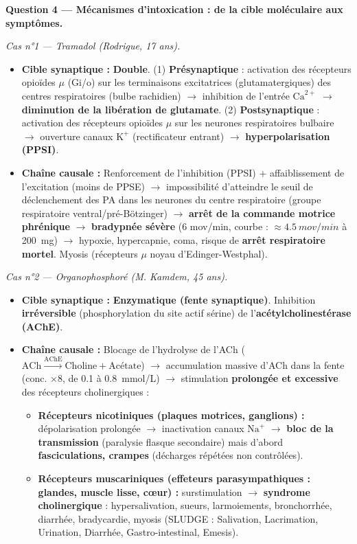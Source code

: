 \documentclass[11pt]{article}
\begin{document}
\begin{exoresolu}
\medskip

\textbf{Question 4 — Mécanismes d'intoxication : de la cible moléculaire aux symptômes.}

\emph{Cas n°1 — Tramadol (Rodrigue, 17 ans).}
\begin{itemize}
\item \textbf{Cible synaptique :} \textbf{Double}. (1) \textbf{Présynaptique} : activation des récepteurs opioïdes $\mu$ (Gi/o) sur les terminaisons excitatrices (glutamatergiques) des centres respiratoires (bulbe rachidien) $\to$ inhibition de l'entrée $\text{Ca}^{2+}$ $\to$ \textbf{diminution de la libération de glutamate}. (2) \textbf{Postsynaptique} : activation des récepteurs opioïdes $\mu$ sur les neurones respiratoires bulbaire $\to$ ouverture canaux $\text{K}^+$ (rectificateur entrant) $\to$ \textbf{hyperpolarisation (PPSI)}.
\item \textbf{Chaîne causale :} Renforcement de l'inhibition (PPSI) + affaiblissement de l'excitation (moins de PPSE) $\to$ impossibilité d'atteindre le seuil de déclenchement des PA dans les neurones du centre respiratoire (groupe respiratoire ventral/pré-Bötzinger) $\to$ \textbf{arrêt de la commande motrice phrénique} $\to$ \textbf{bradypnée sévère} (6 mov/min, courbe : $\approx \SI{4,5}{mov/min}$ à \SI{200}{mg}) $\to$ hypoxie, hypercapnie, coma, risque de \textbf{arrêt respiratoire mortel}. Myosis (récepteurs $\mu$ noyau d'Edinger-Westphal).
\end{itemize}

\emph{Cas n°2 — Organophosphoré (M. Kamdem, 45 ans).}
\begin{itemize}
\item \textbf{Cible synaptique :} \textbf{Enzymatique (fente synaptique)}. Inhibition \textbf{irréversible} (phosphorylation du site actif sérine) de l'\textbf{acétylcholinestérase (AChE)}.
\item \textbf{Chaîne causale :} Blocage de l'hydrolyse de l'ACh ($\text{ACh} \xrightarrow{\text{AChE}} \text{Choline} + \text{Acétate}$) $\to$ accumulation massive d'ACh dans la fente (conc. $\times 8$, de \num{0,1} à \SI{0,8}{mmol/L}) $\to$ stimulation \textbf{prolongée et excessive} des récepteurs cholinergiques :
      \begin{itemize}
      \item \textbf{Récepteurs nicotiniques (plaques motrices, ganglions) :} dépolarisation prolongée $\to$ inactivation canaux $\text{Na}^+$ $\to$ \textbf{bloc de la transmission} (paralysie flasque secondaire) mais d'abord \textbf{fasciculations, crampes} (décharges répétées non contrôlées).
      \item \textbf{Récepteurs muscariniques (effeteurs parasympathiques : glandes, muscle lisse, cœur) :} surstimulation $\to$ \textbf{syndrome cholinergique} : hypersalivation, sueurs, larmoiements, bronchorrhée, diarrhée, bradycardie, myosis (SLUDGE : Salivation, Lacrimation, Urination, Diarrhée, Gastro-intestinal, Emesis).
      \end{itemize}
\end{itemize}


\end{exoresolu}
\end{document}
